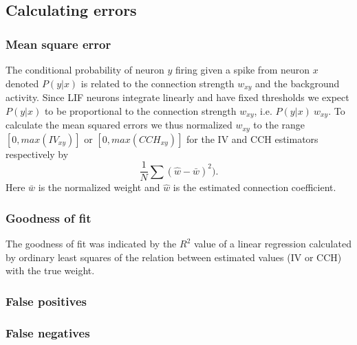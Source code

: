 \documentclass[11pt]{article}
\begin{document}
\subsection{Calculating errors}
\subsubsection{Mean square error}
The conditional probability of neuron $y$ firing given a spike from neuron $x$ denoted $P(y|x)$ is related to the connection strength $w_{xy}$ and the background activity. Since LIF neurons integrate linearly and have fixed thresholds we expect $P(y|x)$ to be proportional to the connection strength $w_{xy}$, i.e.  $P(y|x) ~ w_{xy}$. To calculate the mean squared errors we thus normalized $w_{xy}$ to the range $[0, max(IV_{xy})]$ or $[0, max(CCH_{xy})]$ for the IV and CCH estimators respectively by
\begin{equation*}
    \frac{1}{N}\sum(\hat{w} - \bar{w})^2).
\end{equation*}
Here $\bar{w}$ is the normalized weight and $\hat{w}$ is the estimated connection coefficient.

\subsubsection{Goodness of fit}
The goodness of fit was indicated by the $R^2$ value of a linear regression calculated by ordinary least squares \citep{seabold2010statsmodels} of the relation between estimated values (IV or CCH) with the true weight.

\subsubsection{False positives}

\subsubsection{False negatives}
\end{document}
